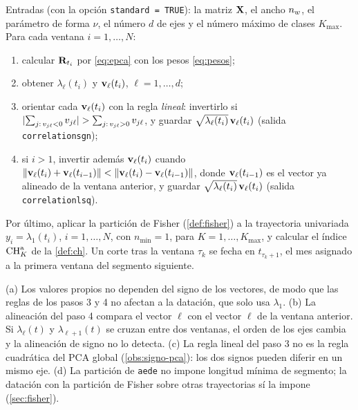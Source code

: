 \begin{algoritmo}\label{alg:aede}
Entradas (con la opción \texttt{standard = TRUE}): la matriz $\mathbf{X}$, el ancho $n_{w}$, el parámetro de forma $\nu$, el número $d$ de ejes y
el número máximo de clases $K_{\max}$. Para cada ventana $i=1,\dots,N$:
\begin{enumerate}[label=\arabic*.]
  \item calcular $\mathbf{R}_{t_i}$ por \cref{eq:epca} con los pesos \cref{eq:pesos};
  \item obtener $\lambda_\ell(t_i)$ y $\mathbf{v}_\ell(t_i)$, $\ell=1,\dots,d$;
  \item orientar cada $\mathbf{v}_\ell(t_i)$ con la regla \emph{lineal}: invertirlo si
    $\lvert \sum_{j:\,v_{j\ell}<0}v_{j\ell}\rvert>\sum_{j:\,v_{j\ell}>0}v_{j\ell}$, y guardar
    $\sqrt{\lambda_\ell(t_i)}\,\mathbf{v}_\ell(t_i)$ (salida \texttt{correlationsgn});
  \item si $i>1$, invertir además $\mathbf{v}_\ell(t_i)$ cuando
    $\lVert \mathbf{v}_\ell(t_i)+\mathbf{v}_\ell(t_{i-1})\rVert<\lVert \mathbf{v}_\ell(t_i)-\mathbf{v}_\ell(t_{i-1})\rVert$, donde
    $\mathbf{v}_\ell(t_{i-1})$ es el vector ya alineado de la ventana anterior, y guardar
    $\sqrt{\lambda_\ell(t_i)}\,\mathbf{v}_\ell(t_i)$ (salida \texttt{correlationlsq}).
\end{enumerate}
Por último, aplicar la partición de Fisher (\cref{def:fisher}) a la trayectoria univariada
$y_i=\lambda_1(t_i)$, $i=1,\dots,N$, con $n_{\min}=1$, para $K=1,\dots,K_{\max}$, y calcular el
índice $\operatorname{CH}^{\mathrm a}_K$ de la \cref{def:ch}. Un corte tras la ventana $\tau_k$ se fecha en
$t_{\tau_k+1}$, el mes asignado a la primera ventana del segmento siguiente.
\end{algoritmo}

\begin{observacion}\label{obs:aede}
(a) Los valores propios no dependen del signo de los vectores, de modo que las reglas de los pasos
3 y 4 no afectan a la datación, que solo usa $\lambda_1$. (b) La alineación del paso 4 compara el
vector $\ell$ con el vector $\ell$ de la ventana anterior. Si $\lambda_\ell(t)$ y
$\lambda_{\ell+1}(t)$ se cruzan entre dos ventanas, el orden de los ejes cambia y la alineación
de signo no lo detecta. (c) La regla lineal del paso 3 no es la regla cuadrática del PCA global
(\cref{obs:signo-pca}): los dos signos pueden diferir en un mismo eje. (d) La partición de
\texttt{aede} no impone longitud mínima de segmento; la datación con la partición de Fisher sobre
otras trayectorias sí la impone (\cref{sec:fisher}).
\end{observacion}

